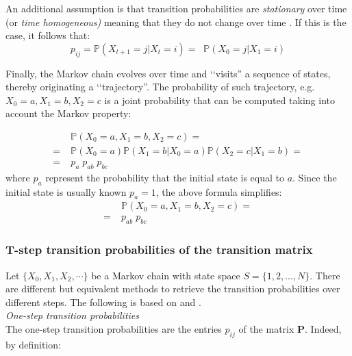 \documentclass[\main/main.tex]{subfiles}
\begin{document}
An additional assumption is that transition probabilities are \textit{stationary} over time (or \textit{time homogeneous)} meaning that they do not change over time \citep{Sheskin2010}. If this is the case, it follows that:
\begin{equation}
    p_{ij} = \mathds{P}(X_{t+1} = j |X_t = i)  = \; \; \mathds{P}(X_{0} = j |X_1 = i)
\end{equation}


\noindent Finally, the Markov chain evolves over time and \lq\lq visits'' a sequence of states, thereby originating a \lq\lq trajectory''. The probability of such trajectory, e.g. $X_0 = a, X_1 = b, X_2 = c$ is a joint probability that can be computed taking into account the Markov property:

\begin{equation}
\begin{split}
   &\mathds{P}(X_0 = a, X_1 = b, X_2 = c) =\\
   =\;  &\mathds{P}(X_0 = a) \mathds{P}(X_1 = b |X_0 = a ) \mathds{P}(X_2 = c |X_1 = b ) = \\
   =\; &p_a \; p_{ab}\; p_{bc}
\end{split}
\end{equation}
where $p_a$ represent the probability that the initial state is equal to $a$. Since the initial state is usually known $p_a = 1$, the above formula simplifies:
\begin{equation}
\begin{split}
   &\mathds{P}(X_0 = a, X_1 = b, X_2 = c) =\\
   =\; &p_{ab}\; p_{bc}
\end{split}
\end{equation}







\subsubsection{T-step transition probabilities of the transition matrix}

Let $\{X_0, X_1, X_2, \cdots \}$ be a Markov chain with state space $S = \{1, 2, . . . ,N\}$. There are different but equivalent methods to retrieve the transition probabilities over different steps. The following is based on \cite{Holmes2015} and \cite{Sheskin2010}. \\

\noindent\textit{One-step transition probabilities}\\
\noindent The one-step transition probabilities are the entries $p_{ij}$ of the matrix $\mathbf{P}$. Indeed, by definition:
\end{document}
